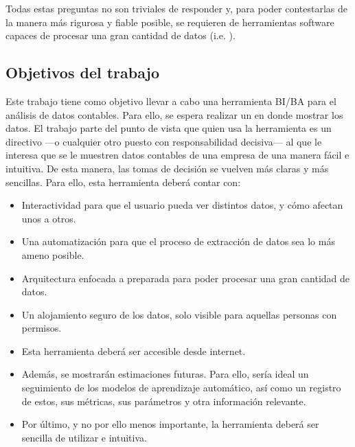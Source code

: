 Todas estas preguntas no son triviales de responder y, para poder contestarlas de la manera más rigurosa y fiable posible, se requieren de herramientas software capaces de procesar una gran cantidad de datos (i.e. ).


\subsection{Objetivos del trabajo}

Este trabajo tiene como objetivo llevar a cabo una herramienta BI/BA para el análisis de datos contables. Para ello, se  espera realizar un  en donde mostrar los datos. El trabajo parte del punto de vista que quien usa la herramienta es un directivo ---o cualquier otro puesto con responsabilidad decisiva--- al que le interesa que se le muestren datos contables de una empresa de una manera fácil e intuitiva. De esta manera, las tomas de decisión se vuelven más claras y más sencillas. Para ello, esta herramienta deberá contar con:
\begin{itemize}
    \item Interactividad para que el usuario pueda ver distintos datos, y cómo afectan unos a otros.
    \item Una automatización para que el proceso de extracción de datos sea lo más ameno posible.
    \item Arquitectura enfocada a  preparada para poder procesar una gran cantidad de  datos.
    \item Un alojamiento seguro de los datos, solo visible para aquellas personas con permisos.
    \item Esta herramienta deberá ser accesible desde internet.
    \item Además, se mostrarán estimaciones futuras. Para ello, sería ideal un seguimiento de los modelos de aprendizaje automático, así como un registro de estos, sus métricas, sus parámetros y otra información relevante.
    \item Por último, y no por ello menos importante, la herramienta deberá ser sencilla de utilizar e intuitiva.
\end{itemize}